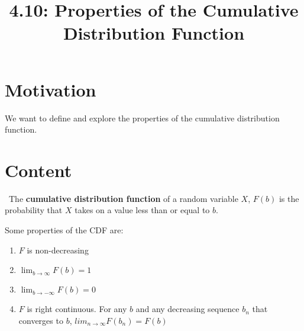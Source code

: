 \documentclass{article}
\title{4.10: Properties of the Cumulative Distribution Function}
\begin{document}
\maketitle

\section{Motivation}

We want to define and explore the properties of the cumulative distribution function.

\section{Content}

\begin{definition}[CDF]
\ 
The \textbf{cumulative distribution function} of a random variable $X$, $F(b)$ is the probability that $X$ takes on a value less than or equal to $b$. 
\end{definition}

\begin{proposition}
Some properties of the CDF are:
\begin{enumerate}
    \item $F$ is non-decreasing
    \item $\lim_{b\to \infty} F(b) = 1$
    \item $\lim_{b\to -\infty} F(b) = 0$
    \item $F$ is right continuous. For any $b$ and any decreasing sequence $b_n$ that converges to $b$, $lim_{n\to \infty} F(b_n) = F(b)$
\end{enumerate}
\end{proposition}
\end{document}
